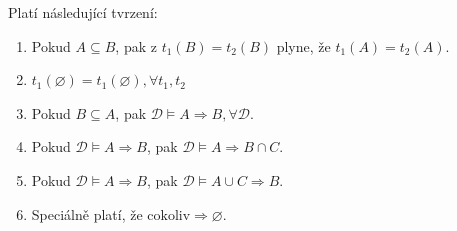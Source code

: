 \begin{upquote}
Platí následující tvrzení:
\begin{enumerate}
\item Pokud $A \subseteq B$, pak z $t_{1}(B) = t_{2}(B)$ plyne, že $t_{1}(A) = t_{2}(A)$.
\item $t_{1}(\varnothing) = t_{1}(\varnothing), \forall t_{1}, t_{2}$
\item Pokud $B \subseteq A$, pak $\mathcal{D} \vDash A \Rightarrow B, \forall \mathcal{D}$.
\item Pokud $\mathcal{D} \vDash A \Rightarrow B$, pak $\mathcal{D} \vDash A \Rightarrow B \cap C$.
\item Pokud $\mathcal{D} \vDash A \Rightarrow B$, pak $\mathcal{D} \vDash A \cup C \Rightarrow B$.
\item Speciálně platí, že $\text{cokoliv} \Rightarrow \varnothing$.
\end{enumerate}
\end{upquote}

